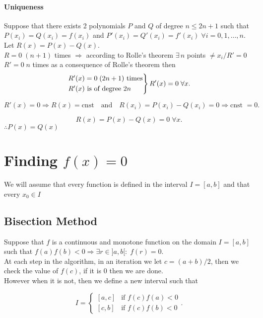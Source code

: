 \documentclass{report}
\begin{document}
\subsubsection{Uniqueness}

\begin{myproof}
	Suppose that there exists 2 polynomials $P$ and $Q$ of degree $n\leq 2n+1$ such that $P(x_i)=Q(x_i)=f(x_i)$ and $P'(x_i)=Q'(x_i)=f'(x_i)\;\forall i = 0,1,\dots,n$.\\
	Let $R(x)=P(x)-Q(x)$.\\
	$R=0\;(n+1)$ times $\Rightarrow$ according to Rolle's theorem $\exists\,n$ points $\neq x_i\Big/R'=0$\\
	$R'=0\;n$ times as a consequence of Rolle's theorem then
	\[
		\begin{rcases}
			R'(x)=0\;(2n+1)\text{ times} \\
			R'(x)\text{ is of degree }2n
		\end{rcases}
		R'(x)=0 \;\forall x
		.\]

	\[
		R'(x)=0\Rightarrow R(x)=\text{cnst}\quad\text{and}\quad R(x_i)=P(x_i)-Q(x_i)=0 \Rightarrow \text{cnst } = 0
		.\]

	\[
		R(x) = P(x)-Q(x)=0 \;\forall x
		.\]
	$\therefore P(x) = Q(x)$
\end{myproof}


\chapter{Finding $f(x)=0$}

We will assume that every function is defined in the interval $I = [a,b]$ and that every $x_0\in I$

\section{Bisection Method}

Suppose that $f$ is a continuous and monotone function on the domain $I = [a,b]$ such that $f(a)f(b)<0\Rightarrow \exists r \in]a,b[:\;f(r)=0$.\\

At each step in the algorithm, in an iteration we let $c = (a+b)/2$, then we check the value of $f(c)$, if it is 0 then we are done.\\
However when it is not, then we define a new interval such that

\[
	I = \begin{cases}
		[a,c] & \text{if }f(c)f(a)<0 \\
		[c,b] & \text{if }f(c)f(b)<0
	\end{cases}
	.\]
\end{document}
